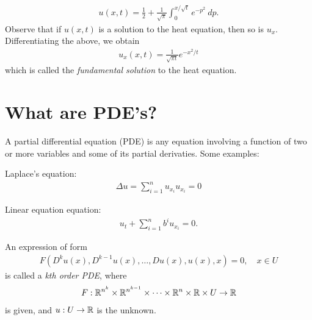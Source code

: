 \begin{equation*}
\begin{split}
	u(x,t) = \frac{1}{2} + \frac{1}{\sqrt{\pi}} \int_{0}^{x / \sqrt{t}}
	e^{-p^{2}} \ dp.
\end{split}
\end{equation*}
Observe that if $u(x,t)$ is a solution to the heat equation, then so is
$u_{x}$. Differentiating the above, we obtain
\begin{equation*}
\begin{split}
u_{x}(x,t) = \frac{1}{\sqrt{\pi t}} e^{-x^{2}/t}
\end{split}
\end{equation*}
which is called the \emph{fundamental solution } to the heat equation.

\chapter{What are PDE's?}
A partial differential equation (PDE) is any equation involving a function of 
two or more variables and some of its partial derivaties. Some examples:
\begin{example}
Laplace's equation:
\begin{equation*}
\begin{split}
	\Delta u = \sum_{i=1}^{n} u_{x_{i}} u _{x_{i}} = 0
\end{split}
\end{equation*}
\end{example}
\begin{example}
	Linear equation equation:
	\begin{equation*}
	\begin{split}
		u_{t} + \sum_{i=1}^{n}b^{i}u_{x_{i}} = 0.
	\end{split}
	\end{equation*}
\end{example}
\begin{definition}
An expression of form
\begin{equation*}
\begin{split}
	F(D^{k}u (x), D^{k-1}u(x), \dots, Du(x), u(x), x) = 0, \quad x \in U
\end{split}
\end{equation*}
is called a \emph{kth order PDE}, where
\begin{equation*}
\begin{split}
	F: \mathbb{R}^{n^{k}} \times \mathbb{R}^{n^{k-1}} \times \dots \times \mathbb{R}^{n} \times \mathbb{R}
	\times U \to \mathbb{R}
\end{split}
\end{equation*}
is given, and $u: U \to \mathbb{R}$ is the unknown.
\end{definition}
